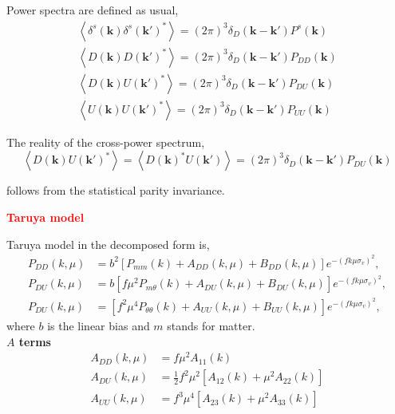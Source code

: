 \documentclass[a4paper,11pt, fleqn]{article}
\begin{document}
\vspace{10mm}
Power spectra are defined as usual,
\begin{align}
  \left\langle \delta^s(\bm{k}) \delta^s(\bm{k}')^* \right\rangle
    = (2\pi)^3 \delta_D(\bm{k} - \bm{k}') P^s(\bm{k})\\
  \left\langle D(\bm{k}) D(\bm{k}')^* \right\rangle
    = (2\pi)^3 \delta_D(\bm{k} - \bm{k}') P_{DD}(\bm{k})\\
  \left\langle D(\bm{k}) U(\bm{k}')^* \right\rangle
    = (2\pi)^3 \delta_D(\bm{k} - \bm{k}') P_{DU}(\bm{k})\\
  \left\langle U(\bm{k}) U(\bm{k}')^* \right\rangle
    = (2\pi)^3 \delta_D(\bm{k} - \bm{k}') P_{UU}(\bm{k})
\end{align}

\vspace{10mm}
The reality of the cross-power spectrum,
%
\begin{equation}
  \left\langle D(\bm{k}) U(\bm{k}')^* \right\rangle =
  \left\langle D(\bm{k})^* U(\bm{k}') \right\rangle =
  (2\pi)^3 \delta_D(\bm{k} - \bm{k}') P_{DU}(\bm{k})
\end{equation}

follows from the statistical parity invariance. 


%
%
\newpage
{\Huge \textbf{\textcolor{Red}{Taruya model}}}

\vspace{5mm}

Taruya model in the decomposed form is,\vspace{-2mm}
\begin{align}
  P_{DD}(k, \mu) &= b^2 \left[
    P_{mm}(k) + A_{DD}(k, \mu) + B_{DD}(k, \mu)
    \right] e^{- (fk\mu\sigma_v)^2},\\
  P_{DU}(k, \mu) &= b \left[
    f\mu^2 P_{m\theta}(k) + A_{DU}(k, \mu) + B_{DU}(k, \mu)
    \right] e^{- (fk\mu\sigma_v)^2},\\
  P_{DU}(k, \mu) &= \left[
    f^2 \mu^4 P_{\theta\theta}(k) + A_{UU}(k, \mu) + B_{UU}(k, \mu)
    \right] e^{- (fk\mu\sigma_v)^2},   
\end{align}
where $b$ is the linear bias and $m$ stands for matter.\\


\textbf{$A$ terms}\vspace{-2mm}
\begin{align}
  A_{DD}(k, \mu) &= f\mu^2 A_{11}(k)\\
  A_{DU}(k, \mu) &= \frac{1}{2} f^2 \mu^2 \left[
                   A_{12}(k) + \mu^2 A_{22}(k) \right]\\
  A_{UU}(k, \mu) &= f^3 \mu^4 \left[ A_{23}(k) + \mu^2 A_{33}(k) \right]
\end{align}
\end{document}
